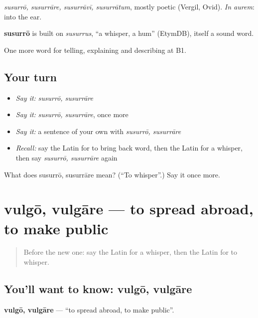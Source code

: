 \emph{susurrō, susurrāre, susurrāvī, susurrātum}, mostly poetic (Vergil, Ovid). \emph{In aurem}: into the ear.

\begin{cousinweb}
\textbf{susurrō} is built on \emph{susurrus}, \textquotedblleft{}a whisper, a hum\textquotedblright{} (EtymDB), itself a sound word.
\end{cousinweb}

\begin{grammarlens}[title={What you've built}]
One more word for telling, explaining and describing at B1.
\end{grammarlens}

\subsection*{Your turn}
\begin{itemize}
\raggedright
  \item \emph{Say it:} \emph{susurrō, susurrāre}
  \item \emph{Say it:} \emph{susurrō, susurrāre}, once more
  \item \emph{Say it:} a sentence of your own with \emph{susurrō, susurrāre}
  \item \emph{Recall:} say the Latin for to bring back word, then the Latin for a whisper, then say \emph{susurrō, susurrāre} again
\end{itemize}

\begin{tcolorbox}[breakable,colback=teal!4,colframe=teal!35!black,title={Before you move on}]
What does susurrō, susurrāre mean? (\textquotedblleft{}To whisper\textquotedblright{}.) Say it once more.
\end{tcolorbox}
\section[vulgō, vulgāre]{vulgō, vulgāre — to spread abroad, to make public}

\label{lesson:LA-C301-vulgo}



\begin{quote}
Before the new one: say the Latin for a whisper, then the Latin for to whisper.
\end{quote}

\subsection*{You'll want to know: vulgō, vulgāre}
\textbf{vulgō, vulgāre} — \textquotedblleft{}to spread abroad, to make public\textquotedblright{}.

